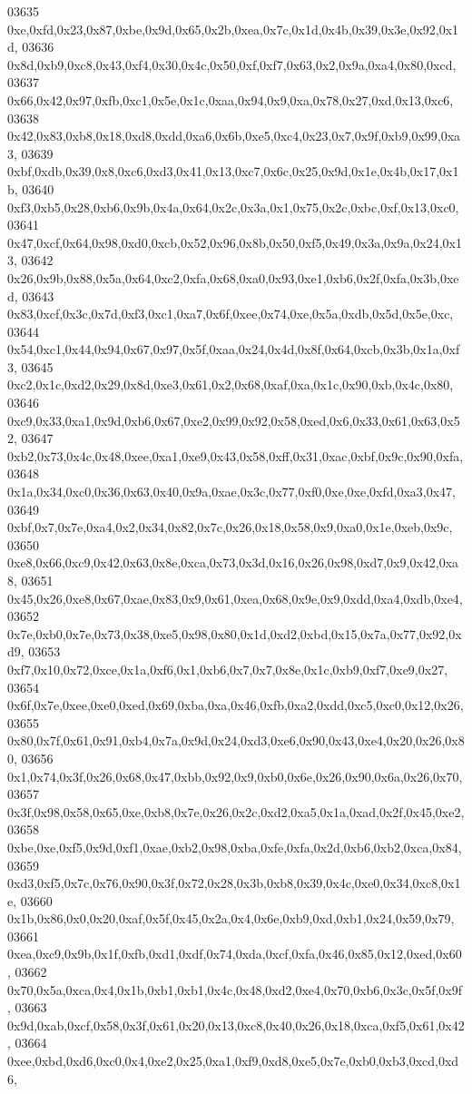 \begin{DoxyCode}
03635   0xe,0xfd,0x23,0x87,0xbe,0x9d,0x65,0x2b,0xea,0x7c,0x1d,0x4b,0x39,0x3e,0x92,0x1d,
03636   0x8d,0xb9,0xc8,0x43,0xf4,0x30,0x4c,0x50,0xf,0xf7,0x63,0x2,0x9a,0xa4,0x80,0xcd,
03637   0x66,0x42,0x97,0xfb,0xc1,0x5e,0x1c,0xaa,0x94,0x9,0xa,0x78,0x27,0xd,0x13,0xc6,
03638   0x42,0x83,0xb8,0x18,0xd8,0xdd,0xa6,0x6b,0xe5,0xc4,0x23,0x7,0x9f,0xb9,0x99,0xa3,
03639   0xbf,0xdb,0x39,0x8,0xc6,0xd3,0x41,0x13,0xc7,0x6c,0x25,0x9d,0x1e,0x4b,0x17,0x1b,
03640   0xf3,0xb5,0x28,0xb6,0x9b,0x4a,0x64,0x2c,0x3a,0x1,0x75,0x2c,0xbc,0xf,0x13,0xc0,
03641   0x47,0xcf,0x64,0x98,0xd0,0xcb,0x52,0x96,0x8b,0x50,0xf5,0x49,0x3a,0x9a,0x24,0x13,
03642   0x26,0x9b,0x88,0x5a,0x64,0xc2,0xfa,0x68,0xa0,0x93,0xe1,0xb6,0x2f,0xfa,0x3b,0xed,
03643   0x83,0xcf,0x3c,0x7d,0xf3,0xc1,0xa7,0x6f,0xee,0x74,0xe,0x5a,0xdb,0x5d,0x5e,0xc,
03644   0x54,0xc1,0x44,0x94,0x67,0x97,0x5f,0xaa,0x24,0x4d,0x8f,0x64,0xcb,0x3b,0x1a,0xf3,
03645   0xc2,0x1c,0xd2,0x29,0x8d,0xe3,0x61,0x2,0x68,0xaf,0xa,0x1c,0x90,0xb,0x4c,0x80,
03646   0xc9,0x33,0xa1,0x9d,0xb6,0x67,0xe2,0x99,0x92,0x58,0xed,0x6,0x33,0x61,0x63,0x52,
03647   0xb2,0x73,0x4c,0x48,0xee,0xa1,0xe9,0x43,0x58,0xff,0x31,0xac,0xbf,0x9c,0x90,0xfa,
03648   0x1a,0x34,0xc0,0x36,0x63,0x40,0x9a,0xae,0x3c,0x77,0xf0,0xe,0xe,0xfd,0xa3,0x47,
03649   0xbf,0x7,0x7e,0xa4,0x2,0x34,0x82,0x7c,0x26,0x18,0x58,0x9,0xa0,0x1e,0xeb,0x9c,
03650   0xe8,0x66,0xc9,0x42,0x63,0x8e,0xca,0x73,0x3d,0x16,0x26,0x98,0xd7,0x9,0x42,0xa8,
03651   0x45,0x26,0xe8,0x67,0xae,0x83,0x9,0x61,0xea,0x68,0x9e,0x9,0xdd,0xa4,0xdb,0xe4,
03652   0x7e,0xb0,0x7e,0x73,0x38,0xe5,0x98,0x80,0x1d,0xd2,0xbd,0x15,0x7a,0x77,0x92,0xd9,
03653   0xf7,0x10,0x72,0xce,0x1a,0xf6,0x1,0xb6,0x7,0x7,0x8e,0x1c,0xb9,0xf7,0xe9,0x27,
03654   0x6f,0x7e,0xee,0xe0,0xed,0x69,0xba,0xa,0x46,0xfb,0xa2,0xdd,0xc5,0xc0,0x12,0x26,
03655   0x80,0x7f,0x61,0x91,0xb4,0x7a,0x9d,0x24,0xd3,0xe6,0x90,0x43,0xe4,0x20,0x26,0x80,
03656   0x1,0x74,0x3f,0x26,0x68,0x47,0xbb,0x92,0x9,0xb0,0x6e,0x26,0x90,0x6a,0x26,0x70,
03657   0x3f,0x98,0x58,0x65,0xe,0xb8,0x7e,0x26,0x2c,0xd2,0xa5,0x1a,0xad,0x2f,0x45,0xe2,
03658   0xbe,0xe,0xf5,0x9d,0xf1,0xae,0xb2,0x98,0xba,0xfe,0xfa,0x2d,0xb6,0xb2,0xca,0x84,
03659   0xd3,0xf5,0x7c,0x76,0x90,0x3f,0x72,0x28,0x3b,0xb8,0x39,0x4c,0xe0,0x34,0xc8,0x1e,
03660   0x1b,0x86,0x0,0x20,0xaf,0x5f,0x45,0x2a,0x4,0x6e,0xb9,0xd,0xb1,0x24,0x59,0x79,
03661   0xea,0xc9,0x9b,0x1f,0xfb,0xd1,0xdf,0x74,0xda,0xcf,0xfa,0x46,0x85,0x12,0xed,0x60,
03662   0x70,0x5a,0xca,0x4,0x1b,0xb1,0xb1,0x4c,0x48,0xd2,0xe4,0x70,0xb6,0x3c,0x5f,0x9f,
03663   0x9d,0xab,0xcf,0x58,0x3f,0x61,0x20,0x13,0xc8,0x40,0x26,0x18,0xca,0xf5,0x61,0x42,
03664   0xee,0xbd,0xd6,0xc0,0x4,0xe2,0x25,0xa1,0xf9,0xd8,0xe5,0x7e,0xb0,0xb3,0xcd,0xd6,

\end{DoxyCode}
